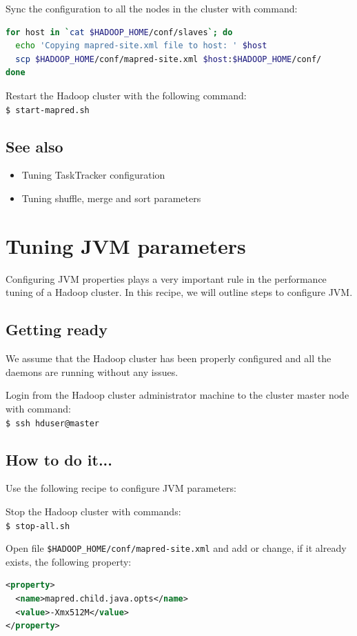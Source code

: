Sync the configuration to all the nodes in the cluster with command:
\lstset{style=bashstyle}
\begin{lstlisting}[language=bash]
for host in `cat $HADOOP_HOME/conf/slaves`; do
  echo 'Copying mapred-site.xml file to host: ' $host
  scp $HADOOP_HOME/conf/mapred-site.xml $host:$HADOOP_HOME/conf/
done
\end{lstlisting}

Restart the Hadoop cluster with the following command: \\
\verb|$ start-mapred.sh|

\subsection*{See also}
\begin{itemize}
  \item Tuning TaskTracker configuration
  \item Tuning shuffle, merge and sort parameters
\end{itemize}

\section{Tuning JVM parameters}
Configuring JVM properties plays a very important rule in the performance tuning of a Hadoop cluster. In this recipe, we will outline steps to configure JVM.
\subsection*{Getting ready}
We assume that the Hadoop cluster has been properly configured and all the daemons are running without any issues.

Login from the Hadoop cluster administrator machine to the cluster master node with command: \\
\verb|$ ssh hduser@master|
\subsection*{How to do it...}
Use the following recipe to configure JVM parameters:

Stop the Hadoop cluster with commands: \\
\verb|$ stop-all.sh|

Open file \verb|$HADOOP_HOME/conf/mapred-site.xml| and add or change, if it already exists, the following property:
\lstset{style=bashstyle}
\begin{lstlisting}[language=XML]
<property>
  <name>mapred.child.java.opts</name>
  <value>-Xmx512M</value>
</property>
\end{lstlisting}


